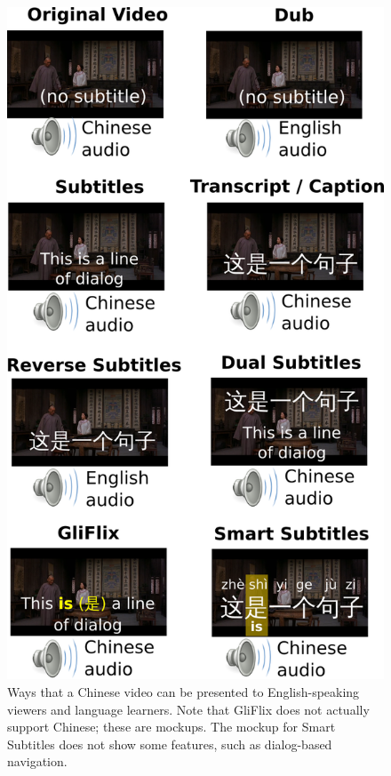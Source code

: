\documentclass{sigchi}
\begin{document}
\begin{figure}[!h]
\centering
\includegraphics[width=\columnwidth]{subtitle-types-2column}
\caption{Ways that a Chinese video can be presented
to English-speaking viewers and language learners.
Note that GliFlix does not actually support Chinese; these are mockups.
The mockup for Smart Subtitles does not show some features, such
as dialog-based navigation.}
\label{fig:figure1}
\end{figure}
\end{document}
